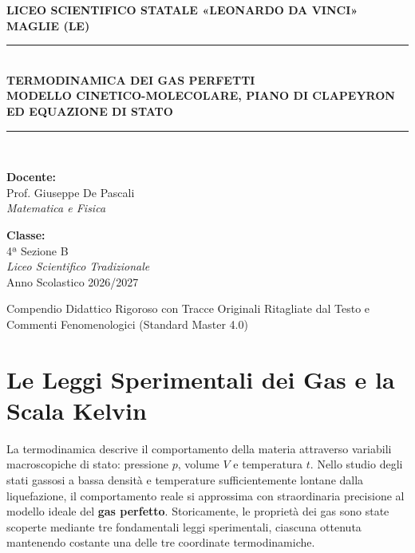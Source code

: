 \documentclass[11pt,a4paper,oneside]{report}
\begin{document}
\begin{titlepage}
\begin{center}
  \vspace*{1cm}
  {\Large\textbf{LICEO SCIENTIFICO STATALE «LEONARDO DA VINCI»}}\\[0.3cm]
  {\large\textbf{MAGLIE (LE)}}\\[2cm]
  \rule{\textwidth}{1.5pt}\\[0.5cm]
  {\Huge\textbf{\color{primaryBlue} TERMODINAMICA DEI GAS PERFETTI}}\\[0.4cm]
  {\Large\textbf{MODELLO CINETICO-MOLECOLARE, PIANO DI CLAPEYRON ED EQUAZIONE DI STATO}}\\[0.5cm]
  \rule{\textwidth}{1.5pt}\\[2.2cm]
  
  \begin{minipage}{0.45\textwidth}
    \textbf{Docente:}\\
    Prof. Giuseppe De Pascali\\
    \textit{Matematica e Fisica}
  \end{minipage}
  \hfill
  \begin{minipage}{0.45\textwidth}
    \raggedleft
    \textbf{Classe:}\\
    4ª Sezione B\\
    \textit{Liceo Scientifico Tradizionale}\\
    Anno Scolastico 2026/2027
  \end{minipage}

  \vfill
  {\small Compendio Didattico Rigoroso con Tracce Originali Ritagliate dal Testo e Commenti Fenomenologici (Standard Master 4.0)}
\end{center}
\end{titlepage}

\tableofcontents
\newpage

\chapter{Le Leggi Sperimentali dei Gas e la Scala Kelvin}

La termodinamica descrive il comportamento della materia attraverso variabili macroscopiche di stato: pressione $p$, volume $V$ e temperatura $t$. Nello studio degli stati gassosi a bassa densità e temperature sufficientemente lontane dalla liquefazione, il comportamento reale si approssima con straordinaria precisione al modello ideale del \textbf{gas perfetto}. Storicamente, le proprietà dei gas sono state scoperte mediante tre fondamentali leggi sperimentali, ciascuna ottenuta mantenendo costante una delle tre coordinate termodinamiche.
\end{document}
